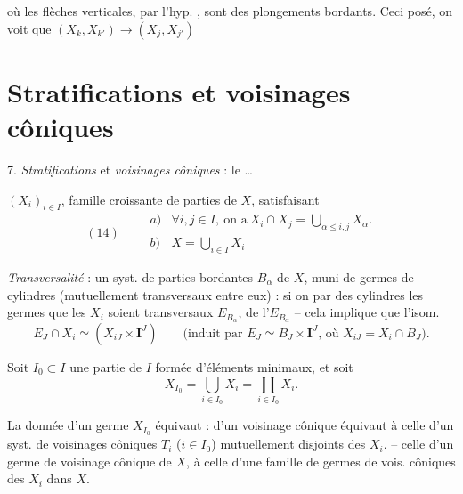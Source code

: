 \documentclass[11pt,a4paper]{article}
\begin{document}
où les flèches verticales, par l'hyp. \ill{}, sont des plongements bordants. Ceci posé, on voit  que  $(X_k,X_{k'})\to(X_j,X_{j'})$

\section*{Stratifications et voisinages côniques}


7. \emph{Stratifications} et \emph{\struck{\ill{}} voisinages côniques} : le  \ldots

$(X_i)_{i\in I}$, famille croissante de parties de $X$, satisfaisant
\[
(14)\qquad
\begin{array}{ll}
a) & \forall i,j\in I,\ \text{on a}\ X_i\cap X_j=\bigcup_{\alpha\le i,j}X_\alpha .\\[4pt]
b) & X=\bigcup_{i\in I}X_i
\end{array}
\]


\emph{Transversalité} : un syst. de parties bordantes $B_\alpha$  de $X$, muni de germes de cylindres  (mutuellement transversaux entre eux) : si on \ill{} \ill{} par des cylindres \ill{}  les germes que \ill{} \ill{} les $X_i$ soient transversaux $E_{B_\alpha}$, \ill{} \ill{}  de l'$E_{B_\alpha}$ -- cela implique que l'isom.
\[
E_J\cap X_i\simeq(X_{iJ}\times\mathbf{I}^J)\qquad\text{(induit par } E_J\simeq B_J\times\mathbf{I}^J\text{, où } X_{iJ}=X_i\cap B_J\text{)}.
\]
\struck{\ill{}}


\struck{\ill{}} Soit $I_0\subset I$ une partie de $I$ formée d'éléments minimaux, \struck{\ill{}} et soit
\[
X_{I_0}=\bigcup_{i\in I_0}X_i=\coprod_{i\in I_0}X_i .
\]

\struck{\ill{}} La donnée d'un germe    $X_{I_0}$ équivaut : d'un voisinage cônique équivaut à celle d'un syst. de voisinages côniques $T_i$ ($i\in I_0$) mutuellement disjoints des $X_i$. -- celle d'un germe de voisinage cônique de $X$, à celle d'une famille de germes de vois. côniques des $X_i$ dans $X$.
\end{document}
